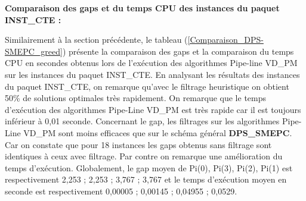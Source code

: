 \textbf{Comparaison des gaps et du temps CPU des instances du paquet INST\_CTE :}

Similairement à la section précédente, le tableau (\ref{Comparaison_DPS-SMEPC_greed}) présente la comparaison des gaps et la comparaison du temps CPU en secondes obtenus lors de l'exécution des algorithmes Pipe-line VD\_PM sur les instances du paquet INST\_CTE.
En analysant les résultats des instances du paquet INST\_CTE, on remarque qu'avec le filtrage heuristique on obtient 50\% de solutions optimales très rapidement. 
On remarque que le temps d'exécution des algorithmes Pipe-Line VD\_PM est très rapide car il est toujours inférieur à 0,01 seconde. 
Concernant le gap, les filtrages sur les algorithmes Pipe-Line VD\_PM sont moins efficaces que sur le schéma général \textbf{DPS\_SMEPC}. Car on constate que pour 18 instances les gaps obtenus sans filtrage sont identiques à ceux avec filtrage. Par contre on remarque une amélioration du temps d'exécution.
Globalement, le gap moyen de Pi(0), Pi(3), Pi(2), Pi(1) est respectivement 2,253 ; 2,253 ; 3,767 ; 3,767 et le temps d'exécution moyen en seconde est respectivement 0,00005 ; 0,00145 ; 0,04955 ; 0,0529. %

